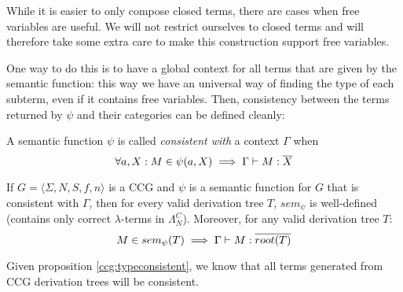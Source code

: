 \documentclass[main.tex]{subfiles}
\begin{document}
While it is easier to only compose closed terms, there are cases when free
variables are useful. We will not restrict ourselves to closed terms and will
therefore take some extra care to make this construction support free variables.

One way to do this is to have a global context for all terms that are given
by the semantic function: this way we have an universal way of finding the
type of each subterm, even if it contains free variables. Then, consistency
between the terms returned by $\psi$ and their categories can be defined
cleanly:

\begin{defn}
    A semantic function $\psi$ is called \emph{consistent with} a context
    $\Gamma$ when
    \[
        \forall a, X: M \in \psi(a, X) \implies \Gamma \vdash M : \overline{X}
    \]
\end{defn}

\begin{prop}
    \label{ccg:typeconsistent}
    If $ G = \langle \Sigma, N, S, f, n \rangle $ is a CCG and $\psi$ is a
    semantic function for $G$ that is consistent with $\Gamma$, then
    for every valid derivation tree $T$, $sem_{\psi}$ is well-defined (contains
    only correct $\lambda$-terms in $\Lambda_N^C$). Moreover, for any valid
    derivation tree $T$:
    \[
        M \in sem_{\psi}(T) \implies \Gamma \vdash M : \overline{root(T)}
    \]
\end{prop}

Given proposition \autoref{ccg:typeconsistent}, we know that all terms generated
from CCG derivation trees will be consistent.
\end{document}
